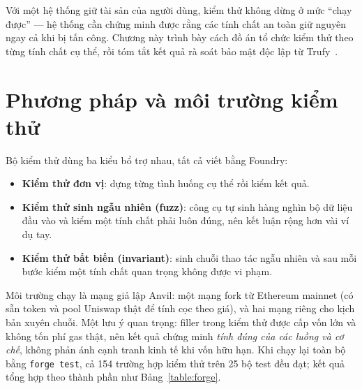 \documentclass[../DoAn.tex]{subfiles}
\begin{document}
Với một hệ thống giữ tài sản của người dùng, kiểm thử không dừng ở mức ``chạy được'' --- hệ thống cần chứng minh được rằng các tính chất an toàn giữ nguyên ngay cả khi bị tấn công. Chương này trình bày cách đồ án tổ chức kiểm thử theo từng tính chất cụ thể, rồi tóm tắt kết quả rà soát bảo mật độc lập từ Trufy~\cite{trufy2026}.

\section{Phương pháp và môi trường kiểm thử}
\label{sec:test-env}

Bộ kiểm thử dùng ba kiểu bổ trợ nhau, tất cả viết bằng Foundry:

\begin{itemize}
    \item \textbf{Kiểm thử đơn vị}: dựng từng tình huống cụ thể rồi kiểm kết quả.
    \item \textbf{Kiểm thử sinh ngẫu nhiên (fuzz)}: công cụ tự sinh hàng nghìn bộ dữ liệu đầu vào và kiểm một tính chất phải luôn đúng, nên kết luận rộng hơn vài ví dụ tay.
    \item \textbf{Kiểm thử bất biến (invariant)}: sinh chuỗi thao tác ngẫu nhiên và sau mỗi bước kiểm một tính chất quan trọng không được vi phạm.
\end{itemize}

Môi trường chạy là mạng giả lập Anvil: một mạng fork từ Ethereum mainnet (có sẵn token và pool Uniswap thật để tính cọc theo giá), và hai mạng riêng cho kịch bản xuyên chuỗi. Một lưu ý quan trọng: filler trong kiểm thử được cấp vốn lớn và không tốn phí gas thật, nên kết quả chứng minh \emph{tính đúng của các luồng và cơ chế}, không phản ánh cạnh tranh kinh tế khi vốn hữu hạn. Khi chạy lại toàn bộ bằng \texttt{forge test}, cả 154 trường hợp kiểm thử trên 25 bộ test đều đạt; kết quả tổng hợp theo thành phần như Bảng~\ref{table:forge}.
\end{document}
